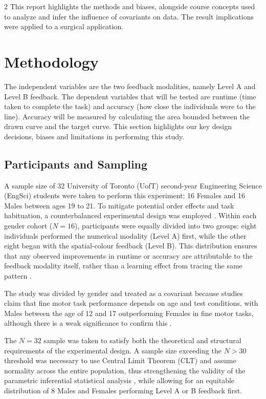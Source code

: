 \documentclass[a4paper,12pt]{article}
\begin{document}
\begin{multicols}{2}
This report highlights the methods and biases, alongside course concepts used to analyze and infer the influence of covariants on data. The result implications were applied to a surgical application. 



\section{Methodology} \label{methods}
The independent variables are the two feedback modalities, namely Level A and Level B feedback. The dependent variables that will be tested are runtime (time taken to complete the task) and accuracy (how close the individuals were to the line). Accuracy will be measured by calculating the area bounded between the drawn curve and the target curve. 
This section highlights our key design decisions, biases and limitations in performing this study. 
\subsection{Participants and Sampling} \label{people}
A sample size of 32 University of Toronto (UofT) second-year Engineering Science (EngSci) students were taken to perform this experiment: 16 Females and 16 Males between ages 19 to 21. To mitigate potential order effects and task habituation, a counterbalanced experimental design was employed \cite{albudaiwi2018sage}. Within each gender cohort ($N=16$), participants were equally divided into two groups: eight individuals performed the numerical modality (Level A) first, while the other eight began with the spatial-colour feedback (Level B). This distribution ensures that any observed improvements in runtime or accuracy are attributable to the feedback modality itself, rather than a learning effect from tracing the same pattern \cite{chiang2015experimental}.

The study was divided by gender and treated as a covariant because studies claim that fine motor task performance depends on age and test conditions, with Males between the age of 12 and 17 outperforming Females in fine motor tasks, although there is a weak significance to confirm this \cite{gender}.

The $N=32$ sample was taken to satisfy both the theoretical and structural requirements of the experimental design. A sample size exceeding the $N > 30$ threshold was necessary to use Central Limit Theorem (CLT) and assume normality across the entire population, thus strengthening the validity of the parametric inferential statistical analysis \cite{ganti2024clt}, while allowing for an equitable distribution of 8 Males and Females performing Level A or B feedback first.


\end{multicols}
\end{document}
